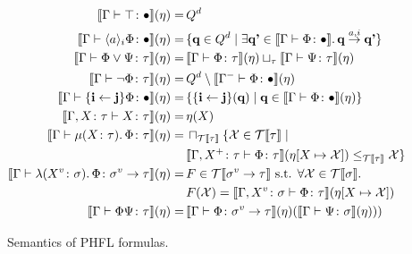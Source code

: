 \begin{figure}
    \caption{Semantics of PHFL formulas.}
    \label{figure:phfl-semantics}
    \begin{align*}
        \llbracket \Gamma \vdash \top \colon \bullet \rrbracket(\eta) =\,& Q^d\\
        \llbracket \Gamma \vdash \langle a \rangle_i \Phi \colon \bullet \rrbracket(\eta) =\,& \{\emph{q} \in Q^d \mid
        \exists \emph{q'} \in \llbracket \Gamma \vdash \Phi \colon \bullet \rrbracket.\,\emph{q}
        \overset{a, i}{\rightarrow} \emph{q'}\}\\
        \llbracket \Gamma \vdash \Phi \vee \Psi \colon \tau \rrbracket(\eta) =\,& \llbracket \Gamma \vdash \Phi
        \colon \tau \rrbracket (\eta) \sqcup_\tau \llbracket \Gamma \vdash \Psi \colon \tau \rrbracket (\eta)\\
        \llbracket \Gamma \vdash \neg \Phi \colon \tau \rrbracket(\eta) =\,& Q^d \setminus \llbracket \Gamma^- \vdash \Phi
        \colon \bullet \rrbracket (\eta)\\
        \llbracket \Gamma \vdash \{\emph{i} \leftarrow \emph{j}\} \Phi \colon \bullet \rrbracket(\eta) =\,&
        \{\{\emph{i} \leftarrow \emph{j}\}(\emph{q}) \mid \emph{q} \in \llbracket \Gamma \vdash \Phi \colon \bullet
        \rrbracket (\eta)\}\\
        \llbracket \Gamma, X \colon \tau \vdash X \colon \tau \rrbracket(\eta) =\,& \eta(X)\\
        \llbracket \Gamma \vdash \mu (X \colon \tau).\,\Phi \colon \tau \rrbracket(\eta) =\,&
        \sqcap_{\mathcal{T}\llbracket\tau\rrbracket} \{\mathcal{X} \in \mathcal{T}\llbracket \tau \rrbracket \mid \\
        &\llbracket \Gamma, X^+ \colon \tau \vdash \Phi \colon \tau \rrbracket(\eta[X \mapsto \mathcal{X}])
        \leq_{\mathcal{T}\llbracket \tau \rrbracket} \mathcal{X}\}\\
        \llbracket \Gamma \vdash \lambda (X^v \colon \sigma).\,\Phi \colon \sigma^v \rightarrow \tau \rrbracket
        (\eta) =\,& F \in \mathcal{T}\llbracket \sigma^v \rightarrow \tau \rrbracket \text{ s.t. } \forall
        \mathcal{X} \in \mathcal{T}\llbracket \sigma \rrbracket.\, \\
        &F(\mathcal{X}) = \llbracket \Gamma, X^v
        \colon \sigma \vdash \Phi \colon \tau \rrbracket (\eta[X \mapsto \mathcal{X}])\\
        \llbracket \Gamma \vdash \Phi \Psi \colon \tau \rrbracket(\eta) =\,& \llbracket \Gamma \vdash \Phi \colon \sigma
        ^v \rightarrow \tau \rrbracket (\eta)(\llbracket \Gamma \vdash \Psi \colon \sigma \rrbracket (\eta)))
    \end{align*}
\end{figure}

